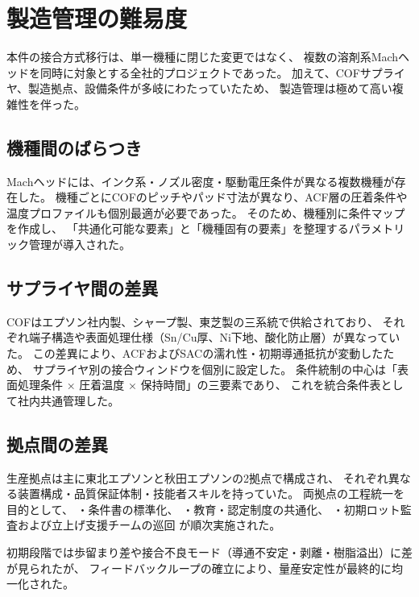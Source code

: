 \documentclass[conference]{IEEEtran}
\begin{document}
\section{製造管理の難易度}

本件の接合方式移行は、単一機種に閉じた変更ではなく、  
複数の溶剤系Machヘッドを同時に対象とする全社的プロジェクトであった。  
加えて、COFサプライヤ、製造拠点、設備条件が多岐にわたっていたため、  
製造管理は極めて高い複雑性を伴った。

\subsection{機種間のばらつき}
Machヘッドには、インク系・ノズル密度・駆動電圧条件が異なる複数機種が存在した。  
機種ごとにCOFのピッチやパッド寸法が異なり、ACF層の圧着条件や温度プロファイルも個別最適が必要であった。  
そのため、機種別に条件マップを作成し、  
「共通化可能な要素」と「機種固有の要素」を整理するパラメトリック管理が導入された。

\subsection{サプライヤ間の差異}
COFはエプソン社内製、シャープ製、東芝製の三系統で供給されており、  
それぞれ端子構造や表面処理仕様（Sn/Cu厚、Ni下地、酸化防止層）が異なっていた。  
この差異により、ACFおよびSACの濡れ性・初期導通抵抗が変動したため、  
サプライヤ別の接合ウィンドウを個別に設定した。  
条件統制の中心は「表面処理条件 × 圧着温度 × 保持時間」の三要素であり、  
これを統合条件表として社内共通管理した。

\subsection{拠点間の差異}
生産拠点は主に東北エプソンと秋田エプソンの2拠点で構成され、  
それぞれ異なる装置構成・品質保証体制・技能者スキルを持っていた。  
両拠点の工程統一を目的として、  
・条件書の標準化、  
・教育・認定制度の共通化、  
・初期ロット監査および立上げ支援チームの巡回  
が順次実施された。  

初期段階では歩留まり差や接合不良モード（導通不安定・剥離・樹脂溢出）に差が見られたが、  
フィードバックループの確立により、量産安定性が最終的に均一化された。
\end{document}
